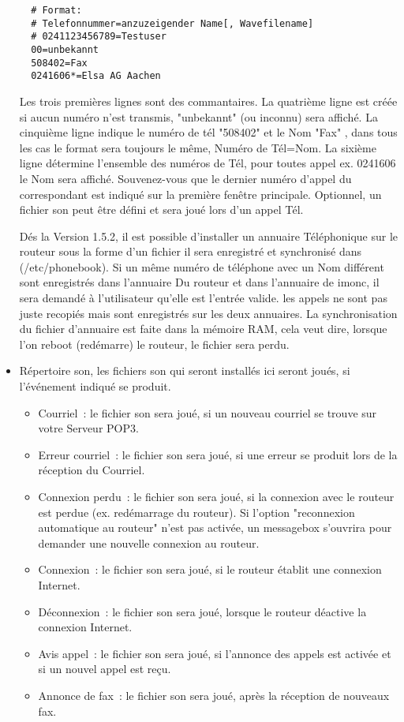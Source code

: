 \begin{itemize}
\begin{example}
\begin{verbatim}
  # Format:
  # Telefonnummer=anzuzeigender Name[, Wavefilename]
  # 0241123456789=Testuser
  00=unbekannt
  508402=Fax
  0241606*=Elsa AG Aachen
\end{verbatim}
\end{example}

    Les trois premières lignes sont des commantaires. La quatrième
    ligne est créée si aucun numéro n'est transmis, "unbekannt" (ou inconnu)
    sera affiché. La cinquième ligne indique le numéro de tél "508402" et le
    Nom "Fax" , dans tous les cas le format sera toujours le même, Numéro de
    Tél=Nom. La sixième ligne détermine l'ensemble des numéros de Tél, pour
    toutes appel ex. 0241606 le Nom sera affiché. Souvenez-vous que le dernier
    numéro d'appel du correspondant est indiqué sur la première fenêtre
    principale. Optionnel, un fichier son peut être défini et sera joué lors
    d'un appel Tél.

    Dés la Version 1.5.2, il est possible d'installer un annuaire Téléphonique
    sur le routeur sous la forme d'un fichier il sera enregistré et synchronisé
    dans (/etc/phonebook). Si un même numéro de téléphone avec un Nom différent
    sont enregistrés dans l'annuaire Du routeur et dans l'annuaire de imonc,
    il sera demandé à l'utilisateur qu'elle est l'entrée valide. les appels ne
    sont pas juste recopiés mais sont enregistrés sur les deux annuaires. La
    synchronisation du fichier d'annuaire est faite dans la mémoire RAM, cela
    veut dire, lorsque l'on reboot (redémarre) le routeur, le fichier sera perdu.

  \item Répertoire son, les fichiers son qui seront installés ici seront joués,
    si l'événement indiqué se produit.
    \begin{itemize}
      \item Courriel~: le fichier son sera joué, si un nouveau courriel se trouve
        sur votre Serveur POP3. 
      \item Erreur courriel~: le fichier son sera joué, si une erreur se produit
        lors de la réception du Courriel.
      \item Connexion perdu~: le fichier son sera joué, si la connexion avec
        le routeur est perdue (ex. redémarrage du routeur). Si l'option
        "reconnexion automatique au routeur" n'est pas activée, un messagebox
        s'ouvrira pour demander une nouvelle connexion au routeur.
      \item Connexion~: le fichier son sera joué, si le routeur établit
        une connexion Internet.
      \item Déconnexion~: le fichier son sera joué, lorsque le routeur déactive
        la connexion Internet.
      \item Avis appel~: le fichier son sera joué, si l'annonce des appels est
        activée et si un nouvel appel est reçu.
      \item Annonce de fax~: le fichier son sera joué, après la réception de
        nouveaux fax.
    \end{itemize}


\end{itemize}
